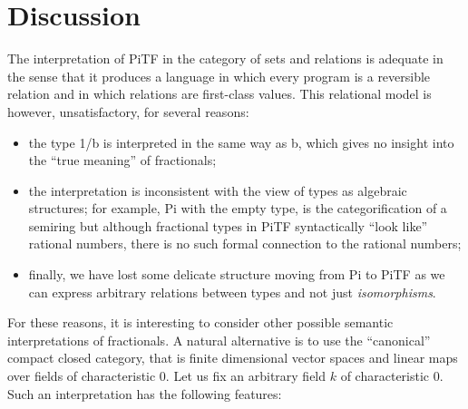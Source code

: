\documentclass{llncs}
\begin{document}

\section{Discussion}
\label{sec:cat} 

The interpretation of {{PiTF}} in the category of sets and relations is
adequate in the sense that it produces a language in which every program is a
reversible relation and in which relations are first-class values. This
relational model is however, unsatisfactory, for several reasons:

\begin{itemize}
\item the type {{1/b}} is interpreted in the same way as {{b}}, which gives no
  insight into the ``true meaning'' of fractionals;
\item the interpretation is inconsistent with the view of types as algebraic
  structures; for example, {{Pi}} with the empty type, is the
  categorification of a semiring but although fractional types in {{PiTF}}
  syntactically ``look like'' rational numbers, there is no such formal
  connection to the rational numbers;
\item finally, we have lost some delicate structure moving from {{Pi}} to
  {{PiTF}} as we can express arbitrary relations between types and not just
  \emph{isomorphisms}.
\end{itemize}

For these reasons, it is interesting to consider other possible semantic
interpretations of fractionals. A natural alternative is to use the
``canonical'' compact closed category, that is finite dimensional vector
spaces and linear maps\cite{Selinger:2011:FDH:1942319.1942398,Hasegawa:2008:FDV:1805839.1805859} over fields of characteristic $0$. Let us fix an arbitrary
field $k$ of characteristic $0$.
Such an interpretation has the following features:
\end{document}
